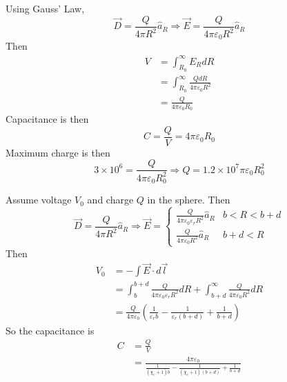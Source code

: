 \documentclass[answers]{exam}
\begin{document}
\begin{questions}

\begin{solution}
	Using Gauss' Law,
	$$\vec{D} = \frac{Q}{4\pi R^2}\hat{a}_R \Rightarrow \vec{E} = \frac{Q}{4\pi\varepsilon_0R^2}\hat{a}_R$$
	Then
	\begin{align*}
		V &= \int_{R_0}^\infty E_R dR \\
		  &= \int_{R_0}^\infty \frac{QdR}{4\pi\varepsilon_0R^2} \\
		  &= \frac{Q}{4\pi\varepsilon_0R_0}
	\end{align*}
	Capacitance is then
	$$C = \frac{Q}{V} = 4\pi\varepsilon_0R_0$$
	Maximum charge is then
	$$3\times10^6 = \frac{Q}{4\pi\varepsilon_0R_0^2} \Rightarrow Q = 1.2\times10^7\pi\varepsilon_0R_0^2$$
\end{solution}


\begin{solution}
	Assume voltage $V_0$ and charge $Q$ in the sphere. Then
	$$\vec{D} = \frac{Q}{4\pi R^2}\hat{a}_R \Rightarrow \vec{E} = \begin{cases} \frac{Q}{4\pi\varepsilon_0\varepsilon_r R^2}\hat{a}_R & b < R < b + d \\ \frac{Q}{4\pi\varepsilon_0 R^2}\hat{a}_R & b + d < R \end{cases}$$
	Then
	\begin{align*}
		V_0 &= -\int \vec{E} \cdot d\vec{l} \\
		    &= \int_b^{b+d} \frac{Q}{4\pi\varepsilon_0\varepsilon_r R^2} dR + \int_{b+d}^\infty \frac{Q}{4\pi\varepsilon_0 R^2} dR \\
		    &= \frac{Q}{4\pi\varepsilon_0}\left(\frac{1}{\varepsilon_rb} - \frac{1}{\varepsilon_r(b+d)} + \frac{1}{b+d}\right)
	\end{align*}
	So the capacitance is
	\begin{align*}
		C &= \frac{Q}{V} \\
		  &= \frac{4\pi\varepsilon_0}{\frac{1}{(\chi_e+1)b} - \frac{1}{(\chi_e+1)(b+d)} + \frac{1}{b+d}}
	\end{align*}
\end{solution}
\end{questions}
\end{document}
